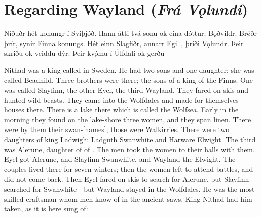 \sectionline

\section{Regarding Wayland (\emph{Frá Vǫlundi})}

\bpg\bpa{}Níðuðr hét konungr í Svíþjóð.
Hann átti tvá sonu ok eina dóttur;  Bǫðvildr.
Brǿðr  þrír, synir Finna konungs. Hét einn Slagfiðr, annarr Egill, þriði Vǫlundr.
Þeir skriðu ok veiddu dýr. Þeir kvǫ́mu í Úlfdali ok gerðu \epa

\bpb Nithad was a king called in Sweden.
He had two sons and one daughter; she was called Beadhild.
Three brothers were there; the sons of a king of the Finns. One was called Slayfinn, the other Eyel, the third Wayland.
They fared on skis and hunted wild beasts. They came into the Wolfdales and made for themselves houses there.
There is a lake there which is called the Wolfsea.
Early in the morning they found on the lake-shore three women, and they span linen. There were by them their swan-[hames]; those were Walkirries.
There were two daughters of king Ladwigh: Ladguth Swanwhite and Harware Elwight. The third was Alerune, daughter of  of .
The men took the women to their halls with them.  Eyel got Alerune, and Slayfinn Swanwhite, and Wayland the Elwight.
The couples lived there for seven winters; then the women left to attend battles, and did not come back.
Then Eyel fared on skis to search for Alerune, but Slayfinn searched for Swanwhite—but Wayland stayed in the Wolfdales.
He was the most skilled craftsman whom men know of in the ancient saws. King Nithad had him taken, as it is here sung of:\epb\epg


